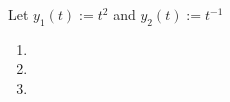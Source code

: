 Let $y_1(t) := t^2$ and $y_2(t) := t^{-1}$

\begin{enumerate}[label=(\alph*)]
    \item 
    \item 
    \item 
\end{enumerate}